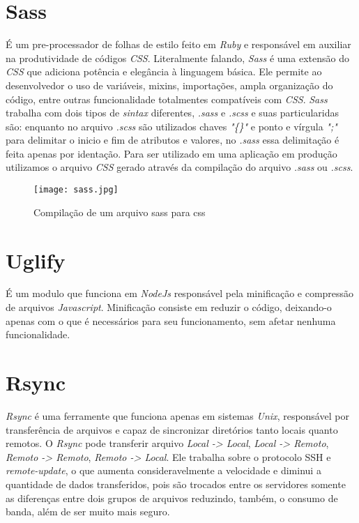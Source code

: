     \section{Sass\label{sec:sass}}
        É um pre-processador de folhas de estilo feito em \emph{Ruby} e responsável em auxiliar na produtividade de códigos \emph{CSS}. Literalmente falando, \emph{Sass} é uma extensão do \emph{CSS} que adiciona potência e elegância à linguagem básica. Ele permite ao desenvolvedor o uso de variáveis, mixins, importações, ampla organização do código, entre outras funcionalidade totalmentes compatíveis com \emph{CSS}. \emph{Sass} trabalha com dois tipos de \emph{sintax} diferentes, \emph{.sass} e \emph{.scss} e suas particularidas são: enquanto no arquivo \emph{.scss} são utilizados chaves \emph{"\{\}"} e ponto e vírgula \emph{";"} para delimitar o inicio e fim de atributos e valores, no \emph{.sass} essa delimitação é feita apenas por identação. Para ser utilizado em uma aplicação em produção utilizamos o arquivo \emph{CSS} gerado através da compilação do arquivo \emph{.sass} ou \emph{.scss}.

        \begin{figure}[!htb]
            \centering
            \texttt{[image: sass.jpg]}
            \caption{\small Compilação de um arquivo sass para css}
            \label{cap:sass}
        \end{figure}


    \section{Uglify\label{sec:uglify}}
        É um modulo que funciona em \emph{NodeJs} responsável pela minificação e compressão de arquivos \emph{Javascript}. Minificação consiste em reduzir o código, deixando-o apenas com o que é necessários para seu funcionamento, sem afetar nenhuma funcionalidade.


    \section{Rsync\label{sec:rsync}}
        \emph{Rsync} é uma ferramente que funciona apenas em sistemas \emph{Unix}, responsável por transferência de arquivos e capaz de sincronizar diretórios tanto locais quanto remotos. O \emph{Rsync} pode transferir arquivo \emph{Local -> Local}, \emph{Local -> Remoto}, \emph{Remoto -> Remoto}, \emph{Remoto -> Local}. Ele trabalha sobre o protocolo SSH e \emph{remote-update}, o que aumenta consideravelmente a velocidade e diminui a quantidade de dados transferidos, pois são trocados entre os servidores somente as diferenças entre dois grupos de arquivos reduzindo, também, o consumo de banda, além de ser muito mais seguro.


